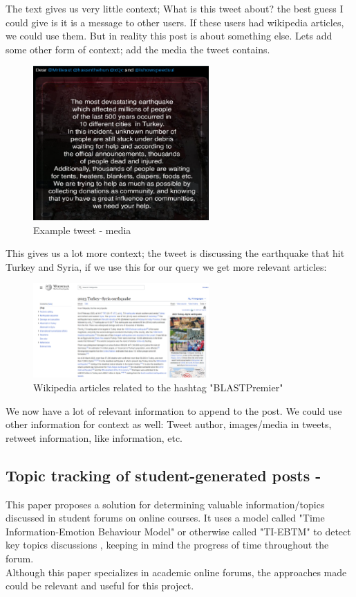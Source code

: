 The text gives us very little context; What is this tweet about? the best guess I could give
is it is a message to other users. If these users had wikipedia articles, we could use them. But in reality this post is about something else.
Lets add some other form of context; add the media the tweet contains.
\begin{figure}
    \centering
    \includegraphics[width=0.6\textwidth]{../images/tweet-media.png}
    \caption{Example tweet - media}
    \label{fig:tweet-media}
\end{figure}
This gives us a lot more context; the tweet is discussing the earthquake that hit Turkey and Syria, if we use this for our query we get more relevant
articles:
\newpage

\begin{figure}[htbp]
    \centering
    \includegraphics[width=0.6\textwidth]{../images/post-context-example.png}
    \caption{Wikipedia articles related to the hashtag "BLASTPremier"}
    \label{fig:blastpremier}
\end{figure}

We now have a lot of relevant information to append to the post. We could use other information for context as well: Tweet author,
images/media in tweets, retweet information, like information, etc.

\subsection{Topic tracking of student-generated posts - \cite{TopicTracking}}
This paper proposes a solution for determining valuable information/topics discussed in student forums on online courses.
It uses a model called "Time Information-Emotion Behaviour Model" or otherwise called "TI-EBTM" to detect key topics discussions
, keeping in mind the progress of time throughout the forum.\\
Although this paper specializes in academic online forums, the approaches made could be relevant and useful for this project.


